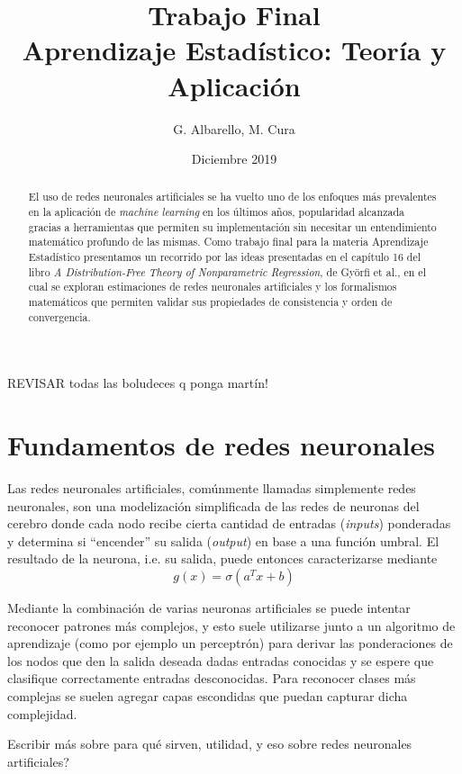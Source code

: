 \documentclass[12pt]{extarticle}
\title{Trabajo Final \\ Aprendizaje Estadístico: Teoría y Aplicación}
\author{G. Albarello, M. Cura}
\date{Diciembre 2019}
\newenvironment{comentarios_meta}
    {\begin{framed}\noindent\textcolor{red}{\textbf{//}}}
    {\end{framed}}
\begin{document}
\maketitle

\begin{comentarios_meta}
    REVISAR todas las boludeces q ponga martín!
\end{comentarios_meta}

\begin{abstract}
    El uso de redes neuronales artificiales se ha vuelto uno de los enfoques más prevalentes en la aplicación de \textit{machine learning} en los últimos años, popularidad alcanzada gracias a herramientas que permiten su implementación sin necesitar un entendimiento matemático profundo de las mismas. Como trabajo final para la materia Aprendizaje Estadístico presentamos un recorrido por las ideas presentadas en el capítulo 16 del libro \textit{A Distribution-Free Theory of Nonparametric Regression}, de Györfi et al., en el cual se exploran estimaciones de redes neuronales artificiales y los formalismos matemáticos que permiten validar sus propiedades de consistencia y orden de convergencia.
\end{abstract}


\section{Fundamentos de redes neuronales}

    Las redes neuronales artificiales, comúnmente llamadas simplemente redes neuronales, son una modelización simplificada de las redes de neuronas del cerebro donde cada nodo recibe cierta cantidad de entradas (\textit{inputs}) ponderadas y determina si ``encender'' su salida (\textit{output}) en base a una función umbral. El resultado de la neurona, i.e. su salida, puede entonces caracterizarse mediante
    \begin{equation*}    
        g(x) = \sigma(a^T x + b)
    \end{equation*}

    Mediante la combinación de varias neuronas artificiales se puede intentar reconocer patrones más complejos, y esto suele utilizarse junto a un algoritmo de aprendizaje (como por ejemplo un perceptrón) para derivar las ponderaciones de los nodos que den la salida deseada dadas entradas conocidas y se espere que clasifique correctamente entradas desconocidas. Para reconocer clases más complejas se suelen agregar capas escondidas que puedan capturar dicha complejidad.
    \begin{comentarios_meta}
        Escribir más sobre para qué sirven, utilidad, y eso sobre redes neuronales artificiales?
    \end{comentarios_meta}
    
\end{document}
